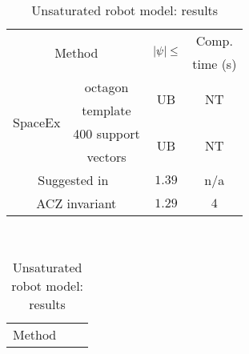 \begin{table}
\begin{minipage}{0.48\textwidth}
\centering
\begin{tabular}{|l|c|c|c|}
\hline
\multicolumn{2}{|c|}{\multirow{2}{*}{Method}} &
\multirow{2}{*}{$\left|\psi\right|\leq$} & Comp.\\
\multicolumn{2}{|c|}{} & & time (s)\\
\hline
\multirow{4}{*}{SpaceEx} & octagon & \multirow{2}{*}{UB} & \multirow{2}{*}{NT}\\
& template & & \\
\cline{2-4}
& 400 support & \multirow{2}{*}{UB} & \multirow{2}{*}{NT}\\
& vectors & &\\
\hline
\multicolumn{2}{|c|}{\multirow{2}{*}{Suggested in~\cite{heinz2014benchmark}}} &
\multirow{2}{*}{$1.39$} & \multirow{2}{*}{n/a}\\
\multicolumn{2}{|c|}{} & &\\
\hline
\multicolumn{2}{|c|}{\multirow{2}{*}{ACZ invariant}} & \multirow{2}{*}{$1.29$} &
\multirow{2}{*}{$4$}\\
\multicolumn{2}{|c|}{} & & \\
\hline
\end{tabular}
\caption{Unsaturated robot model: results}
~\label{tab:robot-unsaturated}
\vspace{-1.5em}
\end{minipage}
\hspace{0em}
\begin{minipage}{0.48\textwidth}
\centering
\begin{tabular}{|l|c|c|c|}
\hline
\multicolumn{2}{|c|}{\multirow{2}{*}{Method}} &

\end{tabular}
\end{minipage}
\end{table}

